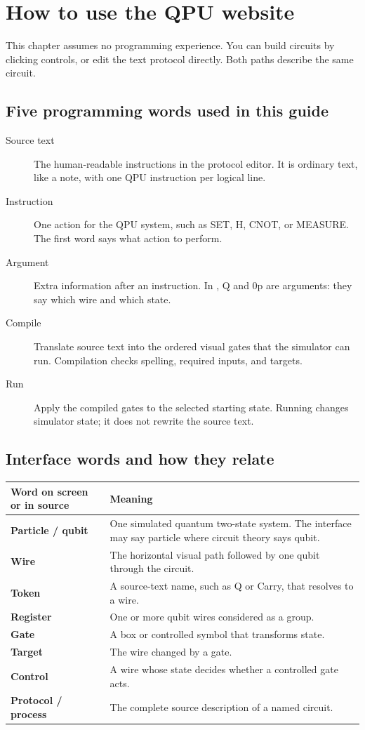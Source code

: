 \section{How to use the QPU website}

This chapter assumes no programming experience. You can build circuits by
clicking controls, or edit the text protocol directly. Both paths describe the
same circuit.

\subsection{Five programming words used in this guide}

\begin{description}
  \item[Source text] The human-readable instructions in the protocol editor.
  It is ordinary text, like a note, with one QPU instruction per logical line.
  \item[Instruction] One action for the QPU system, such as SET, H, CNOT, or
  MEASURE. The first word says what action to perform.
  \item[Argument] Extra information after an instruction. In
  , Q and 0p are arguments: they say which wire and which state.
  \item[Compile] Translate source text into the ordered visual gates that the
  simulator can run. Compilation checks spelling, required inputs, and targets.
  \item[Run] Apply the compiled gates to the selected starting state. Running
  changes simulator state; it does not rewrite the source text.
\end{description}

\subsection{Interface words and how they relate}

\begin{center}
\begin{tabularx}{\textwidth}{>{\bfseries}l X}
\toprule
Word on screen or in source & Meaning\\
\midrule
Particle / qubit & One simulated quantum two-state system. The interface may
say particle where circuit theory says qubit.\\
Wire & The horizontal visual path followed by one qubit through the circuit.\\
Token & A source-text name, such as Q or Carry, that resolves to a wire.\\
Register & One or more qubit wires considered as a group.\\
Gate & A box or controlled symbol that transforms state.\\
Target & The wire changed by a gate.\\
Control & A wire whose state decides whether a controlled gate acts.\\
Protocol / process & The complete source description of a named circuit.\\
\bottomrule
\end{tabularx}
\end{center}

